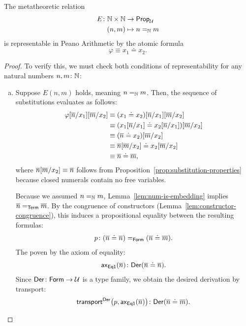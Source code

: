\begin{prop}
    The metatheoretic relation
    \begin{align*}
        E\colon\N\times\N&\to\fun{Prop}_\univ\\
        (n,m)&\mapsto n\eq\N m
    \end{align*}
    is representable in Peano Arithmetic by the atomic formula
    \[
        \varphi \equiv x_1 \doteq x_2.
    \]    
\end{prop}

\begin{proof}
    To verify this, we must check both conditions of representability for any natural numbers $n,m\colon\N$:
    \begin{enumerate}[a),font=\upshape]
        \item Suppose $E(n,m)$ holds, meaning $n \mathrel{=_{\mathbb{N}}} m$. Then, the sequence of substitutions evaluates as follows:
        \begin{align*}
            \varphi[{\overline{n}}/x_1][{\overline{m}}/x_2]
                &\equiv(x_1\doteq x_2)[{\overline{n}}/x_1]
                    [{\overline{m}}/x_2]\\
            &\equiv(x_1[{\overline{n}}/x_1]\doteq x_2[{\overline{n}}/x_1])
                [{\overline{m}}/x_2]\\
            &\equiv({\overline{n}}\doteq x_2)[{\overline{m}}/x_2]\\
            &\equiv{\overline{n}}[{\overline{m}}/x_2]
                \doteq x_2[{\overline{m}}/x_2]\\
            &\equiv{\overline{n}}\doteq{\overline{m}},
        \end{align*}
        where ${\overline{n}}[{\overline{m}}/x_2]\equiv{\overline{n}}$ follows from Proposition~\ref{prop:substitution-properties} because closed numerals contain no free variables. 

        Because we assumed $n \mathrel{=_{\mathbb{N}}} m$, Lemma~\ref{lem:num-is-embedding} implies ${\overline{n}}\mathrel{=_{\mathsf{Term}}}{\overline{m}}$. By the congruence of constructors (Lemma~\ref{lem:constructor-congruence}), this induces a propositional equality between the resulting formulas:
        \[
            p\colon(\num{n}\doteq\num{n})
            \eq{\fun{Form}}(\num{n}\doteq\num{m}).
        \]
        The \lhs poven by the axiom of equality:
        \[
            \fun{ax}_{\fun{Eq1}}(\num{n})\colon
                \fun{Der}(\num{n}\doteq\num{n}).
        \]
        Since $\fun{Der}\colon\fun{Form}\to\univ$ is a type family, we obtain the desired derivation by transport:
        \[
            \fun{transport}^{\fun{Der}}\bigl(
                p,
                \fun{ax}_{\fun{Eq1}}(\num{n})
            \bigr)
            \colon\fun{Der}(\num{n}\doteq\num{m}).
        \]
        

\end{enumerate}
\end{proof}
